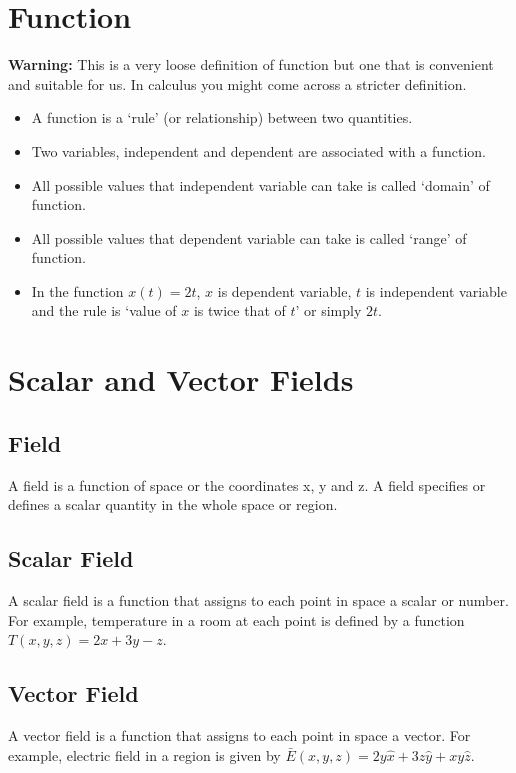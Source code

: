 \documentclass[12pt,a4paper]{article}
\begin{document}
\section{Function}
\noindent\textbf{Warning:} This is a very loose definition of function but one that is convenient and suitable for us. In calculus you might come across a stricter definition.
\begin{itemize}
\item A function is a `rule' (or relationship) between two quantities.
\item Two variables, independent and dependent are associated with a function.
\item All possible values that independent variable can take is called `domain' of function.
\item All possible values that dependent variable can take is called `range' of function.
\item In the function $x(t)=2t$, $x$ is dependent variable, $t$ is independent variable and the rule is `value of $x$ is twice that of $t$' or simply $2t$.
\end{itemize}
\section{Scalar and Vector Fields}
\subsection{Field}
A field is a function of space or the coordinates x, y and z. A field specifies or defines a scalar quantity in the whole space or region.
\subsection{Scalar Field}
A scalar field is a function that assigns to each point in space a scalar or number. For example, temperature in a room at each point is defined by a function $T(x, y, z)=2x+3y-z$.
\subsection{Vector Field}
A vector field is a function that assigns to each point in space a vector. For example, electric field in a region is given by $\bar{E}(x, y, z)=2y\hat{x}+3z\hat{y}+xy\hat{z}$.
\end{document}
